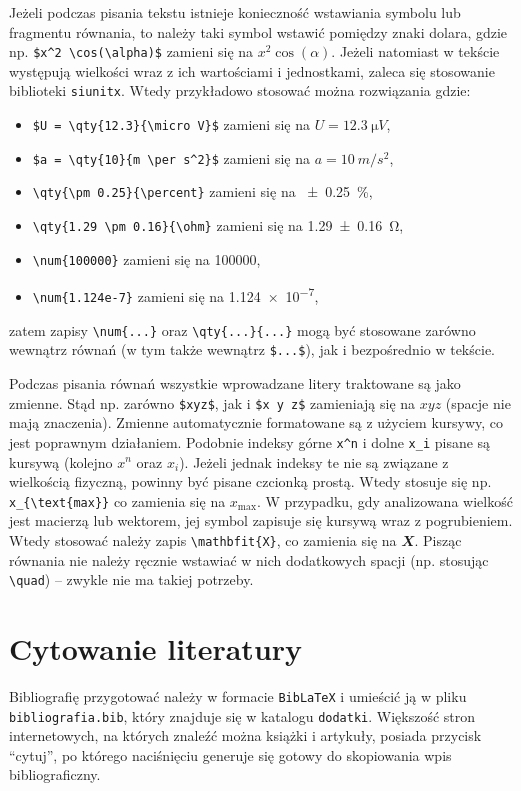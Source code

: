 Jeżeli podczas pisania tekstu istnieje konieczność wstawiania symbolu lub fragmentu równania, to należy taki symbol wstawić pomiędzy znaki dolara, gdzie np. \verb|$x^2 \cos(\alpha)$| zamieni się na $x^2 \cos(\alpha)$. Jeżeli natomiast w tekście występują wielkości wraz z ich wartościami i jednostkami, zaleca się stosowanie biblioteki \verb|siunitx|. Wtedy przykładowo stosować można rozwiązania gdzie:
\begin{itemize}
\item \verb|$U = \qty{12.3}{\micro V}$| zamieni się na $U = \qty{12.3}{\micro V}$, 
\item \verb|$a = \qty{10}{m \per s^2}$| zamieni się na $a = \qty{10}{m \per s^2}$,
\item \verb|\qty{\pm 0.25}{\percent}| zamieni się na \qty{\pm 0.25}{\percent}, 
\item \verb|\qty{1.29 \pm 0.16}{\ohm}| zamieni się na \qty{1.29 \pm 0.16}{\ohm},
\item \verb|\num{100000}| zamieni się na \num{100000},
\item \verb|\num{1.124e-7}| zamieni się na \num{1.124e-7},
\end{itemize}
zatem zapisy \verb|\num{...}| oraz \verb|\qty{...}{...}| mogą być stosowane zarówno wewnątrz równań (w tym także wewnątrz \verb|$...$|), jak i bezpośrednio w tekście.

Podczas pisania równań wszystkie wprowadzane litery traktowane są jako zmienne. Stąd np. zarówno \verb|$xyz$|, jak i \verb|$x y z$| zamieniają się na $xyz$ (spacje nie mają znaczenia). Zmienne automatycznie formatowane są z użyciem kursywy, co jest poprawnym działaniem. Podobnie indeksy górne \verb|x^n| i dolne \verb|x_i| pisane są kursywą (kolejno $x^n$ oraz $x_i$). Jeżeli jednak indeksy te nie są związane z wielkością fizyczną, powinny być pisane czcionką prostą. Wtedy stosuje się np. \verb|x_{\text{max}}| co zamienia się na $x_{\text{max}}$. W przypadku, gdy analizowana wielkość jest macierzą lub wektorem, jej symbol zapisuje się kursywą wraz z pogrubieniem. Wtedy stosować należy zapis \verb|\mathbfit{X}|, co zamienia się na $\mathbfit{X}$. Pisząc równania nie należy ręcznie wstawiać w nich dodatkowych spacji (np. stosując \verb|\quad|) -- zwykle nie ma takiej potrzeby.

\section{Cytowanie literatury}

Bibliografię przygotować należy w formacie \verb|BibLaTeX| i umieścić ją w pliku \verb|bibliografia.bib|, który znajduje się w katalogu \verb|dodatki|. Większość stron internetowych, na których znaleźć można książki i artykuły, posiada przycisk \enquote{cytuj}, po którego naciśnięciu generuje się gotowy do skopiowania wpis bibliograficzny.

